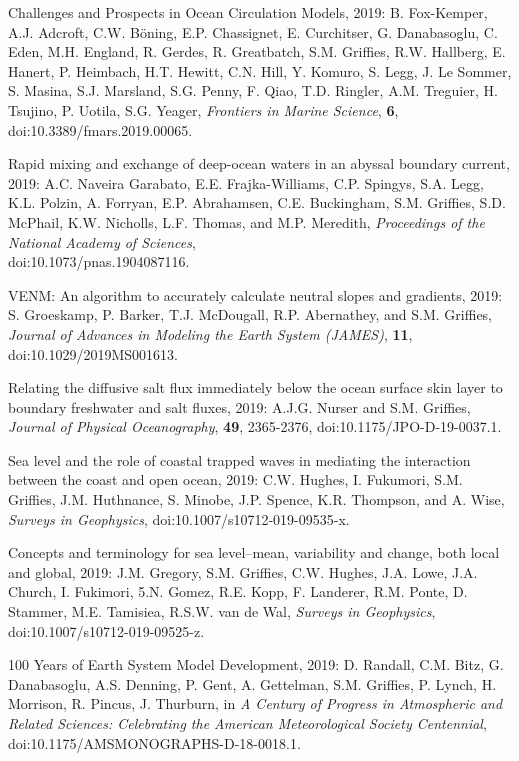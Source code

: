 \begin{etaremune}
\item Challenges and Prospects in Ocean Circulation Models, 2019: B. Fox-Kemper, A.J. Adcroft, C.W. {B\"{o}ning}, E.P. Chassignet, E. Curchitser, G. Danabasoglu, C. Eden, M.H. England, R. Gerdes, R. Greatbatch, S.M. Grif\/f\/ies, R.W. Hallberg, E. Hanert, P. Heimbach, H.T. Hewitt, C.N. Hill, Y. Komuro, S. Legg, J. Le Sommer, S. Masina, S.J. Marsland, S.G. Penny, F. Qiao, T.D. Ringler, A.M. Treguier, H. Tsujino, P. Uotila, S.G. Yeager,
{\it Frontiers in Marine Science}, {\bf 6},
doi:10.3389/fmars.2019.00065.

\item Rapid mixing and exchange of deep-ocean waters in an abyssal boundary current, 2019: A.C. Naveira Garabato, E.E. Frajka-Williams, C.P. Spingys, S.A. Legg, K.L. Polzin, A. Forryan, E.P. Abrahamsen, C.E. Buckingham, S.M. Grif\/f\/ies, S.D. McPhail, K.W. Nicholls, L.F. Thomas, and M.P. Meredith,  {\it Proceedings of the National Academy of Sciences}, \\ doi:10.1073/pnas.1904087116.

\item VENM: An algorithm to accurately calculate neutral slopes and gradients, 2019: S. Groeskamp, P. Barker, T.J. McDougall, R.P. Abernathey, and S.M. Grif\/f\/ies, {\it Journal of Advances in Modeling the Earth System (JAMES)}, {\bf 11}, doi:10.1029/2019MS001613.

\item Relating the diffusive salt flux immediately below the ocean surface skin layer to boundary freshwater and salt fluxes, 2019: A.J.G. Nurser and S.M. Grif\/f\/ies, {\it Journal of Physical Oceanography}, {\bf 49}, 2365-2376, doi:10.1175/JPO-D-19-0037.1.

\item Sea level and the role of coastal trapped waves in mediating the interaction between the coast and open ocean, 2019: C.W. Hughes, I. Fukumori, S.M. Grif\/f\/ies, J.M. Huthnance, S. Minobe, J.P. Spence, K.R. Thompson, and A. Wise, {\it Surveys in Geophysics}, 
doi:10.1007/s10712-019-09535-x.

\item Concepts and terminology for sea level--mean, variability and change, both local and global, 2019: J.M. Gregory, S.M. Grif\/f\/ies, C.W. Hughes, J.A. Lowe, J.A. Church, I. Fukimori, 5.N. Gomez, R.E. Kopp, F. Landerer, R.M. Ponte, D. Stammer, M.E. Tamisiea, R.S.W. van de Wal, {\it Surveys in Geophysics},
doi:10.1007/s10712-019-09525-z.

\item 100 Years of Earth System Model Development, 2019: D. Randall, C.M. Bitz, G. Danabasoglu, A.S. Denning, P. Gent, A. Gettelman, S.M. Grif\/f\/ies, P. Lynch, H. Morrison, R. Pincus, J. Thurburn, in {\it A Century of Progress in Atmospheric and Related Sciences: Celebrating the American Meteorological Society Centennial}, doi:10.1175/AMSMONOGRAPHS-D-18-0018.1.


\end{etaremune}
